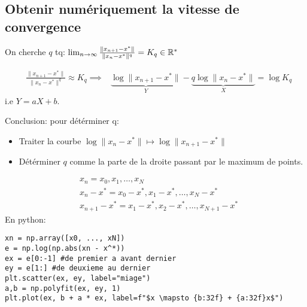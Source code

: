 \subsection{Obtenir numériquement la vitesse de convergence}
On cherche $q$ tq:  $\lim_{n \to \infty} \frac{\|x_{n+1} - x^*\|}{\|x_n - x^*\|^q} = K_q \in  \mathbb{R}^*$
\begin{remark}
    \begin{align*}
        &\frac{\|x_{n+1} - x^*\|}{\|x_n - x^*\|^q} \approx K_q
        \implies& \underbrace{ \log \|x_{n+1} - x^*\|  }_{Y} - \underbrace{q \log\|x_n - x^*\|}_{X} = \log K_q
    \end{align*}
    i.e $Y = aX + b$. 
    \par
    Conclusion: pour détérminer q:
     \begin{itemize}
        \item Traiter la courbe $\log\|x_n - x^*\| \mapsto \log\|x_{n+1} - x^*\|$
        \item Détérminer $q$ comme la parte de la droite passant par le maximum de points.
    \end{itemize}
\end{remark}
\begin{align*}
    &x_n = x_0, x_1, \ldots, x_N\\
    &x_n - x^* = x_0 - x^*, x_1 - x^*, \ldots, x_N - x^*\\
    &x_{n+1} - x^* = x_1 - x^*, x_2 - x^*, \ldots, x_{N+1} - x^*
\end{align*}
En python:

\begin{lstlisting}
xn = np.array([x0, ..., xN])
e = np.log(np.abs(xn - x^*))
ex = e[0:-1] #de premier a avant dernier
ey = e[1:] #de deuxieme au dernier
plt.scatter(ex, ey, label="miage")
a,b = np.polyfit(ex, ey, 1)
plt.plot(ex, b + a * ex, label=f"$x \mapsto {b:32f} + {a:32f}x$")
\end{lstlisting}
